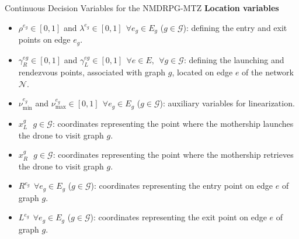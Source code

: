 \documentclass[slidestop,usepdftitle=false,10pt]{beamer}
\begin{document}
    \begin{frame}{Continuous Decision Variables for the NMDRPG-MTZ}
	\textbf{Location variables}
	\small
	\begin{itemize}
        \item $\rho^{e_g} \in [0,1]$ and $\lambda^{e_g} \in [0,1] \:\: \forall e_g \in E_g$ ($g \in \mathcal{G}$): defining the entry and exit points on edge $e_g$.
        \item $\gamma_R^{eg} \in [0,1]$ and $\gamma_{L}^{eg} \in [0,1] \:\: \forall e \in E, \:\: \forall g \in \mathcal{G}$: defining the launching and rendezvous points, associated with graph $g$, located on edge $e$ of the network $\mathcal{N}$.
        \item $\nu_\text{min}^{e_g}$ and $\nu_\text{max}^{e_g} \in [0,1] \:\: \forall e_g \in E_g$ ($g \in \mathcal{G}$): auxiliary variables for linearization.
        \item $x_L^g \:\:\ g \in \mathcal{G}$: coordinates representing the point where the mothership launches the drone to visit graph $g$.
        \item $x_R^g \:\:\ g \in \mathcal{G}$: coordinates representing the point where the mothership retrieves the drone to visit graph $g$.
        \item $R^{e_g} \:\: \forall e_g \in E_g$ ($g \in \mathcal{G}$): coordinates representing the entry point on edge $e$ of graph $g$.
        \item $L^{e_g} \:\: \forall e_g \in E_g$ ($g \in \mathcal{G}$): coordinates representing the exit point on edge $e$ of graph $g$.
    \end{itemize}
    \end{frame}
    
\end{document}
